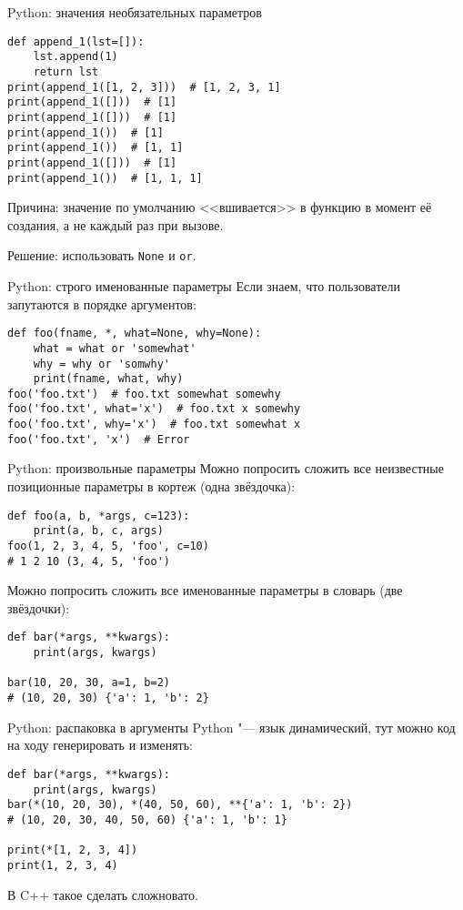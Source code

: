 \begin{frame}[t,fragile]{Python: значения необязательных параметров}
\begin{verbatim}
def append_1(lst=[]):
    lst.append(1)
    return lst
print(append_1([1, 2, 3]))  # [1, 2, 3, 1]
print(append_1([]))  # [1]
print(append_1([]))  # [1]
print(append_1())  # [1]
print(append_1())  # [1, 1]
print(append_1([]))  # [1]
print(append_1())  # [1, 1, 1]
\end{verbatim}
	Причина: значение по умолчанию <<вшивается>> в функцию в момент её создания, а не каждый раз при вызове.
	
	Решение: использовать \verb`None` и \verb`or`.
\end{frame}

\begin{frame}[t,fragile]{Python: строго именованные параметры}
	Если знаем, что пользователи запутаются в порядке аргументов:
\begin{verbatim}
def foo(fname, *, what=None, why=None):
    what = what or 'somewhat'
    why = why or 'somwhy'
    print(fname, what, why)
foo('foo.txt')  # foo.txt somewhat somewhy
foo('foo.txt', what='x')  # foo.txt x somewhy
foo('foo.txt', why='x')  # foo.txt somewhat x
foo('foo.txt', 'x')  # Error
\end{verbatim}
\end{frame}

\begin{frame}[t,fragile]{Python: произвольные параметры}
	Можно попросить сложить все неизвестные позиционные параметры в кортеж
	(одна звёздочка):
\begin{verbatim}
def foo(a, b, *args, c=123):
    print(a, b, c, args)
foo(1, 2, 3, 4, 5, 'foo', c=10)
# 1 2 10 (3, 4, 5, 'foo')
\end{verbatim}

	Можно попросить сложить все именованные параметры в словарь
	(две звёздочки):
\begin{verbatim}
def bar(*args, **kwargs):
    print(args, kwargs)

bar(10, 20, 30, a=1, b=2)
# (10, 20, 30) {'a': 1, 'b': 2}
\end{verbatim}
\end{frame}

\begin{frame}[t,fragile]{Python: распаковка в аргументы}
Python "--- язык динамический, тут можно код на ходу генерировать
и изменять:

\begin{verbatim}
def bar(*args, **kwargs):
    print(args, kwargs)
bar(*(10, 20, 30), *(40, 50, 60), **{'a': 1, 'b': 2})
# (10, 20, 30, 40, 50, 60) {'a': 1, 'b': 1}

print(*[1, 2, 3, 4])
print(1, 2, 3, 4)
\end{verbatim}

В C++ такое сделать сложновато.
\end{frame}

